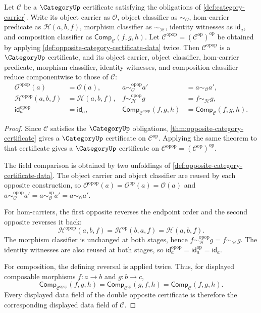 \begin{theorem}
\label{thm:opposite-category-certificate-involution}
Let $\mathcal C$ be a $\CategoryUp$ certificate satisfying the obligations of
\autoref{def:category-carrier}. Write its object carrier as $\mathcal O$,
object classifier as $\sim_{\mathcal O}$, hom-carrier predicate as
$\mathcal H(a,b,f)$, morphism classifier as $\sim_{\mathcal H}$, identity
witnesses as $\mathsf{id}_a$, and composition classifier as
$\mathsf{Comp}_{\mathcal C}(f,g,h)$. Let
$\mathcal C^{\mathrm{opop}}=(\mathcal C^{\mathrm{op}})^{\mathrm{op}}$ be
obtained by applying \autoref{def:opposite-category-certificate-data} twice.
Then $\mathcal C^{\mathrm{opop}}$ is a $\CategoryUp$ certificate, and its
object carrier, object classifier, hom-carrier predicate, morphism classifier,
identity witnesses, and composition classifier reduce componentwise to those of
$\mathcal C$:
$$
\begin{aligned}
\mathcal O^{\mathrm{opop}}(a)&=\mathcal O(a),&
 a\sim_{\mathcal O}^{\mathrm{opop}}a'&=a\sim_{\mathcal O}a',\\
\mathcal H^{\mathrm{opop}}(a,b,f)&=\mathcal H(a,b,f),&
 f\sim_{\mathcal H}^{\mathrm{opop}}g&=f\sim_{\mathcal H}g,\\
\mathsf{id}^{\mathrm{opop}}_a&=\mathsf{id}_a,&
\mathsf{Comp}_{\mathcal C^{\mathrm{opop}}}(f,g,h)&=
\mathsf{Comp}_{\mathcal C}(f,g,h).
\end{aligned}
$$
\end{theorem}
\begin{proof}
Since $\mathcal C$ satisfies the $\CategoryUp$ obligations,
\autoref{thm:opposite-category-certificate} gives a $\CategoryUp$ certificate
on $\mathcal C^{\mathrm{op}}$. Applying the same theorem to that certificate
gives a $\CategoryUp$ certificate on
$\mathcal C^{\mathrm{opop}}=(\mathcal C^{\mathrm{op}})^{\mathrm{op}}$.

The field comparison is obtained by two unfoldings of
\autoref{def:opposite-category-certificate-data}. The object carrier and
object classifier are reused by each opposite construction, so
$\mathcal O^{\mathrm{opop}}(a)=\mathcal O^{\mathrm{op}}(a)=\mathcal O(a)$
and
$a\sim_{\mathcal O}^{\mathrm{opop}}a'=a\sim_{\mathcal O}^{\mathrm{op}}a'=
a\sim_{\mathcal O}a'$.

For hom-carriers, the first opposite reverses the endpoint order and the
second opposite reverses it back:
$$
\mathcal H^{\mathrm{opop}}(a,b,f)
=\mathcal H^{\mathrm{op}}(b,a,f)
=\mathcal H(a,b,f).
$$
The morphism classifier is unchanged at both stages, hence
$f\sim_{\mathcal H}^{\mathrm{opop}}g=f\sim_{\mathcal H}g$. The identity
witnesses are also reused at both stages, so
$\mathsf{id}^{\mathrm{opop}}_a=\mathsf{id}^{\mathrm{op}}_a=\mathsf{id}_a$.

For composition, the defining reversal is applied twice. Thus, for displayed
composable morphisms $f:a\to b$ and $g:b\to c$,
$$
\mathsf{Comp}_{\mathcal C^{\mathrm{opop}}}(f,g,h)
=\mathsf{Comp}_{\mathcal C^{\mathrm{op}}}(g,f,h)
=\mathsf{Comp}_{\mathcal C}(f,g,h).
$$
Every displayed data field of the double opposite certificate is therefore the
corresponding displayed data field of $\mathcal C$.
\end{proof}

